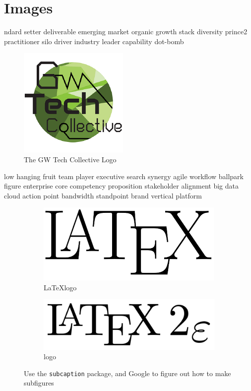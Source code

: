 \documentclass[]{article}
\begin{document}
\section{Images}
ndard setter deliverable emerging market organic growth stack diversity prince2 practitioner silo driver industry leader capability dot-bomb 
\begin{figure}[h]
\centering
\includegraphics[width=.5\linewidth]{gwtc_logo}
\caption{The GW Tech Collective Logo}
\end{figure}
low hanging fruit team player executive search synergy agile workflow ballpark figure enterprise core competency proposition stakeholder alignment big data cloud action point bandwidth standpoint brand vertical platform
\begin{figure}[b]
\begin{subfigure}[b]{.5\textwidth}
    \includegraphics[width=\textwidth]{LaTeX_logo}
    \caption{\LaTeX logo}
\end{subfigure}
\begin{subfigure}[b]{.5\textheight}
    \includegraphics[width=\textwidth]{LaTeX2e_logo}
    \caption{\LaTeXe logo}
\end{subfigure}
\caption{Use the \texttt{subcaption} package, and Google to figure out how to make subfigures}
\end{figure}
\end{document}
